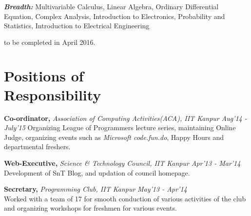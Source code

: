 \documentclass[margin,10pt]{resume}
\begin{document}
\begin{resume}
\begin{list2}
	\vspace{2mm}

	\item \emph{\textbf{Breadth:}} Multivariable Calculus, Linear Algebra, Ordinary Differential Equation, Complex Analysis, Introduction to Electronics, Probability and Statistics, Introduction to Electrical Engineering
\end{list2}
	{\vspace{-3mm}\hfill\small * to be completed in April 2016.}


\section{\mysidestyle Positions of\\Responsibility }
\vspace{5mm}
\begin{list2}
\item \textbf{Co-ordinator,} \emph{Association of Computing Activities(ACA), IIT Kanpur} \hfill \emph{Aug'14 - July'15}
Organizing League of Programmers lecture series, maintaining Online Judge, organizing events such as \emph{Microsoft code.fun.do}, Happy Hours and departmental freshers.
\vspace{2mm}
\item \textbf{Web-Executive,} \emph{Science \& Technology Council, IIT Kanpur} \hfill \emph{Apr'13 - Mar'14}\\
Development of SnT Blog, and updation of council homepage.

\vspace{2mm}
\item \textbf{Secretary,} \emph{Programming Club, IIT Kanpur}  \hfill \emph{May'13 - Apr'14} \\
Worked with a team of 17 for smooth conduction of various activities of the club and organizing workshops for freshmen for various events.

\end{list2}

\end{resume}
\end{document}
